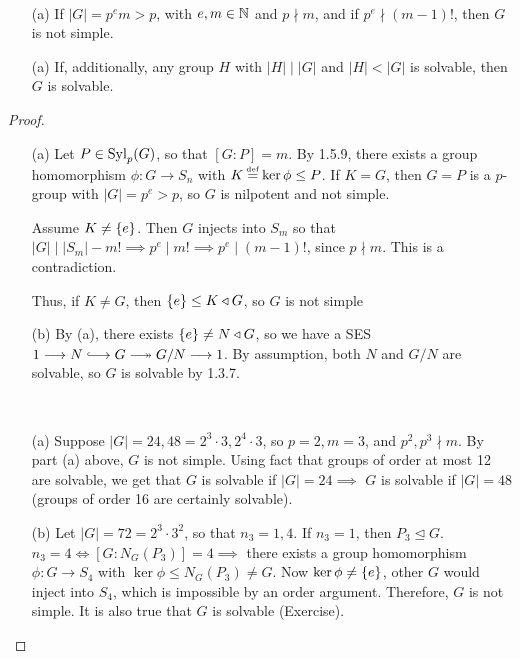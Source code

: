\documentclass[11pt]{book}
\theoremstyle{definition}   \newtheorem{defn}[counter]{Definition} %
\newcommand{\nsg}{\mathrel{\unlhd}}   \newcommand{\ind}{\parindent24pt}   \newcommand{\vn}{\varnothing}
\newcommand\myeq{\mathrel{\overset{\makebox[0pt]{\mbox{\normalfont\tiny\sffamily \textrm{def}}}}{=}}}
\newcommand{\tl}{\triangleleft}   \newcommand{\sd}[1]{\rtimes_{#1}}   \newcommand{\x}{^{\times}}   \newcommand{\cyc}[1]{\begin{pmatrix} #1 \end{pmatrix}}
\newcommand{\hooklongrightarrow}{\lhook\joinrel\longrightarrow}   \newcommand{\twoheadlongrightarrow}{\relbar\joinrel\twoheadrightarrow}
\newcommand{\ses}[5]{1 \longrightarrow #1 \overset{#2}{\hooklongrightarrow} #3 \overset{#4}{\twoheadlongrightarrow} #5 \longrightarrow 1}
\DeclareMathOperator{\ra}{\rightarrow}   \DeclareMathOperator{\Poly}{\mathbf{P}}   \DeclareMathOperator{\spn}{\textnormal{span}}   \DeclareMathOperator{\aut}{\textnormal{Aut}}
\newcommand{\vs}{\vspace{8pt}}
\numberwithin{counter}{chapter}
\begin{document}
\vs

\begin{lemma}\
\begin{enumerate}
\item[(a)] If $|G| = p^e m > p$, with $e,m \in \operatorname{\mathbb{N}}$ and $p \nmid m$, and if $p^e \nmid (m-1)!$, then $G$ is not simple.
\item[(a)] If, additionally, any group $H$ with $|H| \mid |G|$ and $|H| < |G|$ is solvable, then $G$ is solvable.
\end{enumerate}
\end{lemma}

\vs

\begin{proof}
\
\begin{enumerate}
\item[(a)] Let $P \in \textnormal{Syl}_p(G)$, so that $[G : P] = m$. By 1.5.9, there exists a group homomorphism $\phi : G \ra S_n$ with $K \myeq \ker \phi \leq P$. If $K = G$, then $G = P$ is a $p$-group with $|G| = p^e > p$, so $G$ is nilpotent and not simple.

Assume $K \ne \{e\}$. Then $G$ injects into $S_m$ so that $|G| \mid |S_m| - m! \implies p^e \mid m! \implies p^e \mid (m-1)!$, since $p \nmid m$. This is a contradiction.

Thus, if $K \ne G$, then $\triv \leq K \tl G$, so $G$ is not simple

\item[(b)] By (a), there exists $\triv \ne N \tl G$, so we have a SES $\ses{N}{}{G}{}{G/N}$. By assumption, both $N$ and $G/N$ are solvable, so $G$ is solvable by 1.3.7.
\end{enumerate}

\vs

\begin{example}
\
\begin{enumerate}
\item[(a)] Suppose $|G| = 24,48 = 2^3 \cdot 3, 2^4 \cdot 3$, so $p = 2, m = 3$, and $p^2, p^3 \nmid m$. By part (a) above, $G$ is not simple. Using fact that groups of order at most 12 are solvable, we get that $G$ is solvable if $|G| = 24 \implies$ $G$ is solvable if $|G| = 48$ (groups of order 16 are certainly solvable).

\item[(b)] Let $|G| = 72 = 2^3 \cdot 3^2$, so that $n_3 = 1, 4$. If $n_3 = 1$, then $P_3 \nsg G$. $n_3 = 4 \iff [G : N_G(P_3)] = 4 \implies$ there exists a group homomorphism $\phi : G \ra S_4$ with $\ker \phi \leq N_G(P_3) \ne G$. Now $\ker \phi \ne \{e\}$, other $G$ would inject into $S_4$, which is impossible by an order argument. Therefore, $G$ is not simple. It is also true that $G$ is solvable (Exercise).


\end{enumerate}
\end{example}
\end{proof}
\end{document}
